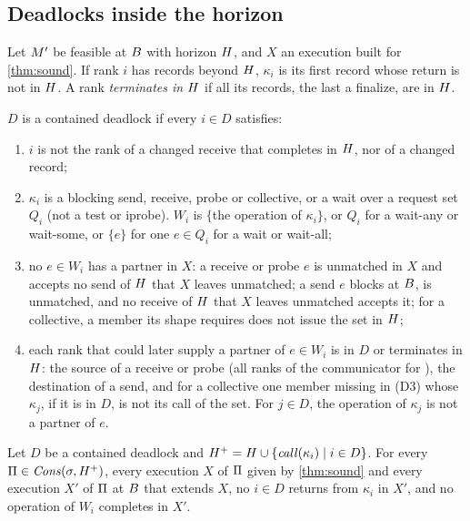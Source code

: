 \subsection{Deadlocks inside the horizon}
\label{app:l1dead}

Let $M'$ be feasible at $B$ with horizon $H$, and $X$ an execution built for
\cref{thm:sound}. If rank $i$ has records beyond $H$, $\kappa_i$ is its first record whose
return is not in $H$. A rank \emph{terminates in $H$} if all its records, the last a
finalize, are in $H$.

\begin{definition}\label{def:app-dead}
$D$ is a contained deadlock if every $i\in D$ satisfies:
\begin{enumerate}[leftmargin=*,label=(D\arabic*)]
\item $i$ is not the rank of a changed receive that completes in $H$, nor of a changed
  record;
\item $\kappa_i$ is a blocking send, receive, probe or collective, or a wait over a request set
  $Q_i$ (not a test or iprobe). $W_i$ is $\{$the operation of $\kappa_i\}$, or $Q_i$ for a
  wait-any or wait-some, or $\{e\}$ for one $e\in Q_i$ for a wait or wait-all;
\item no $e\in W_i$ has a partner in $X$: a receive or probe $e$ is unmatched in $X$ and accepts
  no send of $H$ that $X$ leaves unmatched; a send $e$ blocks at $B$, is unmatched, and no
  receive of $H$ that $X$ leaves unmatched accepts it; for a collective, a member its shape
  requires does not issue the set in $H$;
\item each rank that could later supply a partner of $e\in W_i$ is in $D$ or terminates in
  $H$: the source of a receive or probe (all ranks of the communicator for \ANY), the
  destination of a send, and for a collective one member missing in (D3) whose $\kappa_j$, if it
  is in $D$, is not its call of the set. For $j\in D$, the operation of $\kappa_j$ is not a
  partner of $e$.
\end{enumerate}
\end{definition}

\begin{theorem}\label{thm:app-dead}
Let $D$ be a contained deadlock and $H^+=H\cup\{\mathit{call}(\kappa_i)\mid i\in D\}$. For
every $\Pi\in\mathit{Cons}(\sigma,H^+)$, every execution $X$ of $\Pi$ given by
\cref{thm:sound} and every execution $X'$ of $\Pi$ at $B$ that extends $X$, no $i\in D$
returns from $\kappa_i$ in $X'$, and no operation of $W_i$ completes in $X'$.
\end{theorem}

